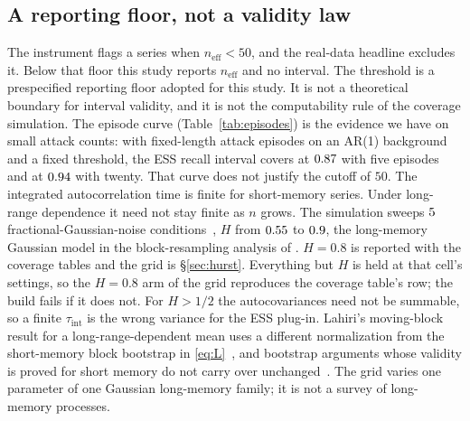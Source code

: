 \documentclass[a4paper,fleqn]{cas-dc}
\newcommand{\neff}{n_{\mathrm{eff}}}
\newcommand{\tabwidth}{\columnwidth}
\newcommand{\tabbody}{\small\setlength{\tabcolsep}{3.5pt}\renewcommand{\arraystretch}{1.08}}
\newcommand{\onetab}{\renewcommand{\tabwidth}{\columnwidth}\tabbody}
\begin{document}
\subsection{A reporting floor, not a validity law}
The instrument flags a series when $\neff<50$, and the real-data headline excludes it. Below that
floor this study reports $\neff$ and no interval. The threshold is a prespecified reporting floor
adopted for this study. It is not a theoretical boundary for interval validity, and it is not the
computability rule of the coverage simulation. The episode curve
(Table~\ref{tab:episodes}) is the evidence we have on small attack counts: with fixed-length attack
episodes on an AR(1) background and a fixed threshold, the ESS recall interval covers at
$0.87$ with five episodes and at $0.94$ with twenty. That curve does not justify the
cutoff of $50$.
The integrated autocorrelation time is finite for
short-memory series. Under long-range dependence it need not stay finite as $n$ grows. The
simulation sweeps $5$ fractional-Gaussian-noise conditions~\citep{mandelbrot1968fractional},
$H$ from $0.55$ to $0.9$, the long-memory Gaussian model in the block-resampling analysis of
\citet{zhang2022block}. $H{=}0.8$ is reported with the coverage
tables and the grid is \S\ref{sec:hurst}. Everything but $H$ is held at that cell's settings, so
the $H{=}0.8$ arm of the grid reproduces the coverage table's row; the build fails if it does not. For $H>1/2$ the autocovariances need not be summable, so a finite $\tau_{\mathrm{int}}$ is
the wrong variance for the ESS plug-in. Lahiri's moving-block result for a long-range-dependent
mean uses a different normalization from the short-memory block bootstrap in
\eqref{eq:L}~\citep{lahiri1993mbb,hall1998lrd}, and bootstrap arguments whose validity is proved for short
memory do not carry over unchanged~\citep{arteche2024bootstrap}. The grid varies one parameter of one
Gaussian long-memory family; it is not a survey of long-memory processes.
\begin{table}[ht]
\centering
\caption{Recall coverage against the number of attack episodes. Fixed episode length, AR(1)
background, fixed threshold, $R{=}400$. From \texttt{diagnostics/episode\_curve.csv}.}\label{tab:episodes}
\onetab

\end{table}
\end{document}
